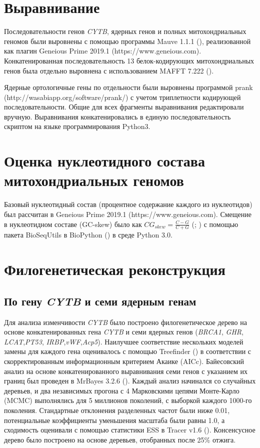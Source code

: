 \section{Выравнивание}

Последовательности генов \textit{CYTB}, ядерных генов и полных митохондриальных геномов были выровнены с помощью программы Mauve 1.1.1 (\cite{Darling2004}), реализованной как плагин Geneious Prime 2019.1 (https://www.geneious.com). Конкатенированная последовательность 13 белок-кодирующих митохондриальных генов была отдельно выровнена с использованием MAFFT 7.222 (\cite{Katoh2014}).

Ядерные ортологичные гены по отдельности были выровнены программой prank (http://wasabiapp.org/software/prank/) с учетом триплетности кодирующей последовательности. Общие для всех фрагменты выравнивания редактировали вручную. Выравнивания конкатенировались в единую последовательность скриптом на языке программирования Python3.

\section{Оценка нуклеотидного состава митохондриальных геномов}

Базовый нуклеотидный состав (процентное содержание каждого из нуклеотидов) был рассчитан в Geneious Prime 2019.1 (https://www.geneious.com). Смещение в нуклеотидном составе (GC-skew) было как $CG_{skew} = \frac{C - G}{C + G}$ (\cite{Arabi2010}; \cite{Hassanin2005}) с помощью пакета BioSeqUtils в BioPython (\cite{Cock2009}) в среде Python 3.0.   

\section{Филогенетическая реконструкция}

\subsection{По гену \textit{CYTB} и семи ядерным генам}

Для анализа изменчивости \textit{CYTB} было построено филогенетическое дерево на основе конкатенированных гена \textit{CYTB} и семи ядерных генов (\textit{BRCA1}, \textit{GHR}, \textit{LCAT},\textit{PT53}, \textit{IRBP},\textit{vWF},\textit{Acp5}). Наилучшее соответствие нескольких моделей замены для каждого гена оценивалось с помощью Treefinder (\cite{Jobb2004}) в соответствии с скорректированным информационным критерием Акаике (AICc). Байесовский анализ на основе конкатенированного выравнивания семи генов с указанием их границ был проведен в MrBayes 3.2.6 (\cite{Ronquist2012}). Каждый анализ начинался со случайных деревьев, и два независимых прогона с 4 Марковскими цепями Монте-Карло (MCMC) выполнялись для 5 миллионов поколений, с выборкой каждого 1000-го поколения. Стандартные отклонения разделенных частот были ниже 0.01, потенциальные коэффициенты уменьшения масштаба были равны 1.0, а сходимость оценивали с помощью статистики ESS в Tracer v1.6 (\cite{Rambaut2014}). Консенсусное дерево было построено на основе деревьев, отобранных после 25\% отжига.

